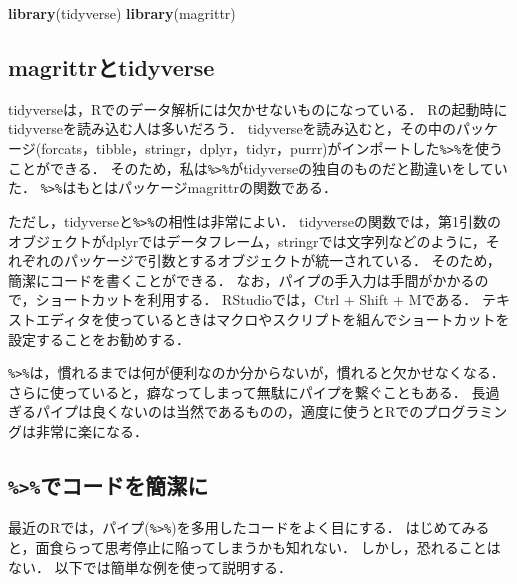 \documentclass[
]{article}
\newenvironment{Shaded}{\begin{snugshade}}{\end{snugshade}}
\newcommand{\FunctionTok}[1]{\textcolor[rgb]{0.13,0.29,0.53}{\textbf{#1}}}
\newcommand{\NormalTok}[1]{#1}
\begin{document}
\begin{Shaded}
\begin{Highlighting}[]
\FunctionTok{library}\NormalTok{(tidyverse)}
\FunctionTok{library}\NormalTok{(magrittr)}
\end{Highlighting}
\end{Shaded}

\hypertarget{magrittrux3068tidyverse}{%
\subsection{magrittrとtidyverse}\label{magrittrux3068tidyverse}}

tidyverseは，Rでのデータ解析には欠かせないものになっている．
Rの起動時にtidyverseを読み込む人は多いだろう．
tidyverseを読み込むと，その中のパッケージ(forcats，tibble，stringr，dplyr，tidyr，purrr)がインポートした\texttt{\%\textgreater{}\%}を使うことができる．
そのため，私は\texttt{\%\textgreater{}\%}がtidyverseの独自のものだと勘違いをしていた．
\texttt{\%\textgreater{}\%}はもとはパッケージmagrittrの関数である．

ただし，tidyverseと\texttt{\%\textgreater{}\%}の相性は非常によい．
tidyverseの関数では，第1引数のオブジェクトがdplyrではデータフレーム，stringrでは文字列などのように，それぞれのパッケージで引数とするオブジェクトが統一されている．
そのため，簡潔にコードを書くことができる．
なお，パイプの手入力は手間がかかるので，ショートカットを利用する．
RStudioでは，Ctrl + Shift + Mである．
テキストエディタを使っているときはマクロやスクリプトを組んでショートカットを設定することをお勧めする．

\texttt{\%\textgreater{}\%}は，慣れるまでは何が便利なのか分からないが，慣れると欠かせなくなる．
さらに使っていると，癖なってしまって無駄にパイプを繋ぐこともある．
長過ぎるパイプは良くないのは当然であるものの，適度に使うとRでのプログラミングは非常に楽になる．

\hypertarget{ux3067ux30b3ux30fcux30c9ux3092ux7c21ux6f54ux306b}{%
\subsection{\texorpdfstring{\texttt{\%\textgreater{}\%}でコードを簡潔に}{\%\textgreater\%でコードを簡潔に}}\label{ux3067ux30b3ux30fcux30c9ux3092ux7c21ux6f54ux306b}}

最近のRでは，パイプ(\texttt{\%\textgreater{}\%})を多用したコードをよく目にする．
はじめてみると，面食らって思考停止に陥ってしまうかも知れない．
しかし，恐れることはない．
以下では簡単な例を使って説明する．
\end{document}
